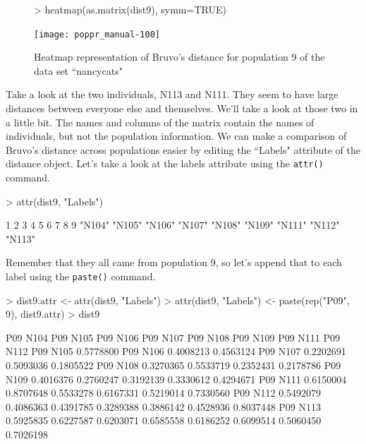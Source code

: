 \documentclass[letterpaper]{article}
\begin{document}
\begin{figure}[h!]
  \centering
  \caption{Heatmap representation of Bruvo's distance for population 9 of the data set ``nancycats"}
  \label{bruvo_heat_map}
\begin{Schunk}
\begin{Sinput}
> heatmap(as.matrix(dist9), symm=TRUE)
\end{Sinput}
\end{Schunk}
\texttt{[image: poppr\_manual-100]}
\end{figure}
\newpage

Take a look at the two individuals, N113 and N111. They seem to have large distances between everyone else and themselves. We'll take a look at those two in a little bit. The names and columns of the matrix contain the names of individuals, but not the population information. We can make a comparison of Bruvo's distance across populations easier by editing the ``Labels" attribute of the distance object. Let's take a look at the labels attribute using the \texttt{attr()} command. 
\begin{Schunk}
\begin{Sinput}
> attr(dist9, "Labels")
\end{Sinput}
\begin{Soutput}
     1      2      3      4      5      6      7      8      9 
"N104" "N105" "N106" "N107" "N108" "N109" "N111" "N112" "N113" 
\end{Soutput}
\end{Schunk}
Remember that they all came from population 9, so let's append that to each label using the \texttt{paste()} command. 
\begin{Schunk}
\begin{Sinput}
> dist9.attr <- attr(dist9, "Labels")
> attr(dist9, "Labels") <- paste(rep("P09", 9), dist9.attr)
> dist9
\end{Sinput}
\begin{Soutput}
          P09 N104  P09 N105  P09 N106  P09 N107  P09 N108  P09 N109  P09 N111  P09 N112
P09 N105 0.5778800                                                                      
P09 N106 0.4008213 0.4563124                                                            
P09 N107 0.2202691 0.5093036 0.1805522                                                  
P09 N108 0.3270365 0.5533719 0.2352431 0.2178786                                        
P09 N109 0.4016376 0.2760247 0.3192139 0.3330612 0.4294671                              
P09 N111 0.6150004 0.8707648 0.5533278 0.6167331 0.5219014 0.7330560                    
P09 N112 0.5492079 0.4086363 0.4391785 0.3289388 0.3886142 0.4528936 0.8037448          
P09 N113 0.5925835 0.6227587 0.6203071 0.6585558 0.6186252 0.6099514 0.5060450 0.7026198
\end{Soutput}
\end{Schunk}
\end{document}
